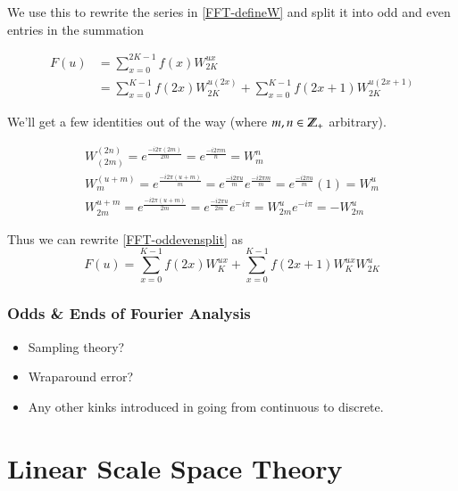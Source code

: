 		We use this to rewrite the series in \cref{FFT-defineW} and split it into odd and even entries in the summation
		
		\begin{align}
		F(u) &= \sum_{x=0}^{2K-1} f(x) W_{2K}^{ux} \\
			 &= \sum_{x=0}^{K-1} f(2x) W_{2K}^{u(2x)}
				 + \sum_{x=0}^{K-1} f(2x+1) W_{2K}^{u(2x+1)} \label{FFT-oddevensplit}
		\end{align}
		
		We'll get a few identities out of the way (where $m, n \in \mathbb{Z}_{+}$ arbitrary).
		
		\begin{gather}
		W_{(2m)}^{(2n)} = e^{\frac{-i2\pi(2m)}{2m}} = e^{\frac{-i2\pi m}{n}} = W_{m}^{n} \\
		W_{m}^{(u+m)} = e^{\frac{-i2\pi(u+m)}{m} } = e^{\frac{-i2\pi u}{m}} e^{\frac{-i2\pi m}{m}}
					= e^{\frac{-i2\pi u }{m}} (1) = W_m^u \\
		W_{2m}^{u+m} = e^{\frac{-i2\pi(u+m)}{2m}} = e^{\frac{-i2\pi u}{2m}} e^{-i\pi}
					 = W_{2m}^{u} e^{-i\pi} = - W_{2m}^{u}
		\end{gather}

Thus we can rewrite \cref{FFT-oddevensplit} as
\begin{equation}
F(u)  = \sum_{x=0}^{K-1} f(2x) W_{K}^{ux} + \sum_{x=0}^{K-1} f(2x+1) W_{K}^{ux} W_{2K}^{u}
\end{equation} 

		
		
		\subsubsection{Odds \& Ends of Fourier Analysis}
		\begin{itemize}
			\item Sampling theory?
			\item Wraparound error?
			\item Any other kinks introduced in going from continuous to discrete.
		\end{itemize}


\hrulefill
\section{Linear Scale Space Theory}
	
